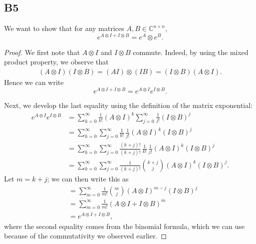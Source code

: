 \documentclass[11pt]{article}
\newcommand{\complex}{\mathbb{C}} %
\newcommand{\kp}{\otimes} %
\begin{document}
\subsection*{B5}
We want to show that for any matrices \(A, B \in \complex^{n \times n}\),
\[
    e^{A\kp I+I\kp B}=e^A\kp e^B.
\]

\begin{proof}
We first note that $A\kp I$ and $I\kp B$ commute.
Indeed, by using the mixed product property, we observe that
\begin{align*}
    (A\kp I)(I\kp B)=(AI)\kp(IB)=(I\kp B)(A\kp I).
\end{align*}
Hence we can write
\begin{equation*}
    e^{A\kp I+I\kp B}=e^{A\kp I}e^{I\kp B}.
\end{equation*}

Next, we develop the last equality using the definition of the matrix exponential:
\begin{align*}
    e^{A\kp I}e^{I\kp B}&=\sum_{k=0}^{\infty}\frac{1}{k!}(A\kp I)^k \sum_{j=0}^{\infty}\frac{1}{j!}(I\kp B)^j\\
    &=\sum_{k=0}^{\infty}\sum_{j=0}^{\infty}\frac{1}{k!}\,\frac{1}{j!}(A\kp I)^k (I\kp B)^j\\
    &=\sum_{k=0}^{\infty}\sum_{j=0}^{\infty}\frac{(k+j)!}{(k+j)!}\,\frac{1}{k!}\,\frac{1}{j!}(A\kp I)^k (I\kp B)^j\\
    &=\sum_{k=0}^{\infty}\sum_{j=0}^{\infty}\frac{1}{(k+j)!}\binom{k+j}{j}(A\kp I)^k (I\kp B)^j.
\end{align*}
Let $m=k+j$; we can then write this as
\begin{align*}
    &=\sum_{m=0}^{\infty}\frac{1}{m!}\binom{m}{j}(A\kp I)^{m-j} (I\kp B)^j\\
    &=\sum_{m=0}^{\infty}\frac{1}{m!}(A\kp I+I\kp B)^m\\
    &=e^{A\kp I+I\kp B},
\end{align*}
where the second equality comes from the binomial formula, which we can use because of the commutativity we observed earlier. 
\end{proof}
\end{document}
